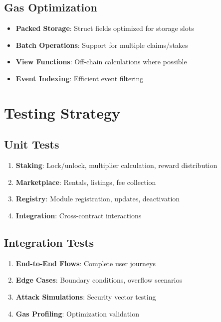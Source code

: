 \documentclass[12pt,a4paper]{article}
\begin{document}
\subsection{Gas Optimization}

\begin{itemize}
    \item \textbf{Packed Storage}: Struct fields optimized for storage slots
    \item \textbf{Batch Operations}: Support for multiple claims/stakes
    \item \textbf{View Functions}: Off-chain calculations where possible
    \item \textbf{Event Indexing}: Efficient event filtering
\end{itemize}

\section{Testing Strategy}

\subsection{Unit Tests}

\begin{enumerate}
    \item \textbf{Staking}: Lock/unlock, multiplier calculation, reward distribution
    \item \textbf{Marketplace}: Rentals, listings, fee collection
    \item \textbf{Registry}: Module registration, updates, deactivation
    \item \textbf{Integration}: Cross-contract interactions
\end{enumerate}

\subsection{Integration Tests}

\begin{enumerate}
    \item \textbf{End-to-End Flows}: Complete user journeys
    \item \textbf{Edge Cases}: Boundary conditions, overflow scenarios
    \item \textbf{Attack Simulations}: Security vector testing
    \item \textbf{Gas Profiling}: Optimization validation
\end{enumerate}
\end{document}
